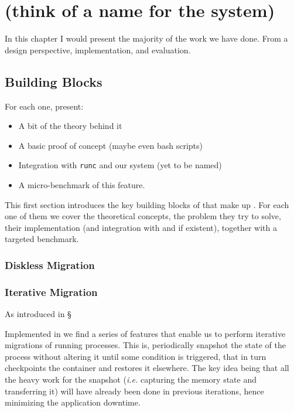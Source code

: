 \chapter{\projName (think of a name for the system)} \label{chap:system}

In this chapter I would present the majority of the work we have done.
From a design perspective, implementation, and evaluation.

\section{Building Blocks}

For each one, present:
\begin{itemize}
    \item A bit of the theory behind it
    \item A basic proof of concept (maybe even bash scripts)
    \item Integration with \texttt{runc} and our system (yet to be named)
    \item A micro-benchmark of this feature.
\end{itemize}

This first section introduces the key building blocks of that make up \projName.
For each one of them we cover the theoretical concepts, the problem they try to solve, their implementation (and integration with \criu and \runc if existent), together with a targeted benchmark.


\subsection{Diskless Migration}

\subsection{Iterative Migration}

As introduced in \S

Implemented in \criu we find a series of features that enable us to perform iterative migrations of running processes.
This is, periodically snapshot the state of the process without altering it until some condition is triggered, that in turn checkpoints the container and restores it elsewhere.
The key idea being that all the heavy work for the snapshot (\textit{i.e.} capturing the memory state and transferring it) will have already been done in previous iterations, hence minimizing the application downtime.


